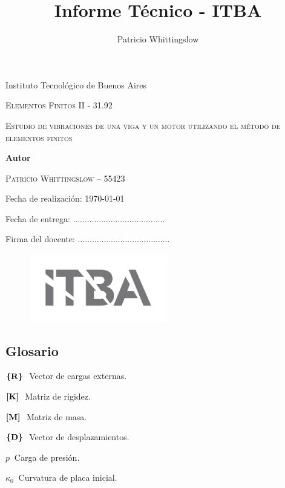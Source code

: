 \documentclass[onecolumn,10pt,titlepage,a4paper]{article}
\title{Informe Técnico - ITBA}
\author{Patricio Whittingslow}
\newcommand{\glossentry}[2]{$#1\ $ \indent #2 \par \vspace{.4cm} }
\begin{document}
\begin{titlepage}
	\centering
	
	{ \large Instituto Tecnológico de Buenos Aires  \par }
	\vspace{2cm}
	{\Large \scshape Elementos Finitos II - 31.92 \par}
	\vspace{2cm}
	{\Huge \scshape Estudio de vibraciones de una viga y un motor utilizando el método de elementos finitos\par }
	\vspace{.5cm}
	{\Large  \par}
	\vspace{2cm}
	{\large \bf Autor \par}
	\vspace{.5cm}
	\textsc{\large Patricio Whittingslow -- 55423}
	\vspace{2cm}
	{\par \large Fecha de realización: \today \par}
	\vspace{1cm}
	{\large Fecha de entrega: .......................................\par}
	\vspace{\fill}
	{\large Firma del docente: .......................................}
	\vspace{\fill}
	\begin{figure}[htb!]
		\centering
		\includegraphics[width=6cm]{fig/logoitba.png}
	\end{figure}
\end{titlepage}




\begin{multicols}{2}
	\section*{Glosario}
	\glossentry{\Cme{R}}{Vector de cargas externas.}
	\glossentry{\Mme{K}}{Matriz de rigidez.}
	\glossentry{\Mme{M}}{Matriz de masa.}
	\glossentry{\Cme{D}}{Vector de desplazamientos.}
	\glossentry{p}{Carga de presión.}
	\glossentry{\kappa_{0}}{Curvatura de placa inicial.}
\end{multicols}
\end{document}
